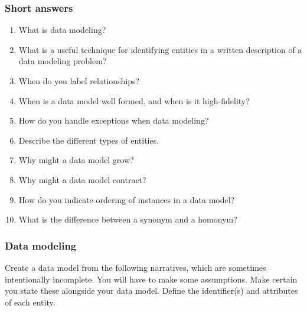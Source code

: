 \documentclass[
]{article}
\begin{document}
\hypertarget{short-answers}{%
\subsubsection*{Short answers}\label{short-answers}}

\begin{enumerate}
\def\labelenumi{\arabic{enumi}.}
\item
  What is data modeling?
\item
  What is a useful technique for identifying entities in a written
  description of a data modeling problem?
\item
  When do you label relationships?
\item
  When is a data model well formed, and when is it high-fidelity?
\item
  How do you handle exceptions when data modeling?
\item
  Describe the different types of entities.
\item
  Why might a data model grow?
\item
  Why might a data model contract?
\item
  How do you indicate ordering of instances in a data model?
\item
  What is the difference between a synonym and a homonym?
\end{enumerate}

\hypertarget{data-modeling-2}{%
\subsubsection*{Data modeling}\label{data-modeling-2}}

Create a data model from the following narratives, which are sometimes
intentionally incomplete. You will have to make some assumptions. Make
certain you state these alongside your data model. Define the
identifier(s) and attributes of each entity.
\end{document}
